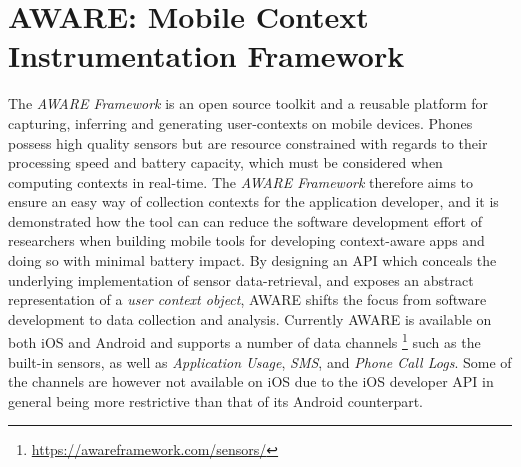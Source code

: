 \section{AWARE: Mobile Context Instrumentation Framework}
The \textit{AWARE Framework} \cite{aware2015} is an open source toolkit and a reusable platform for capturing, inferring and generating user-contexts on mobile devices. Phones possess high quality sensors but are resource constrained with regards to their processing speed and battery capacity, which must be considered when computing contexts in real-time. The \textit{AWARE Framework} therefore aims to ensure an easy way of collection contexts for the application developer, and it is demonstrated how the tool can can reduce the software development effort of researchers when building mobile tools for developing context-aware apps and doing so with minimal battery impact. By designing an API which conceals the underlying implementation of sensor data-retrieval, and exposes an abstract representation of a \textit{user context object}, AWARE shifts the focus from software development to data collection and analysis. Currently AWARE is available on both iOS and Android and supports a number of data channels \footnote{\url{https://awareframework.com/sensors/}} such as the built-in sensors, as well as \textit{Application Usage}, \textit{SMS}, and \textit{Phone Call Logs}. Some of the channels are however not available on iOS due to the iOS developer API in general being more restrictive than that of its Android counterpart.